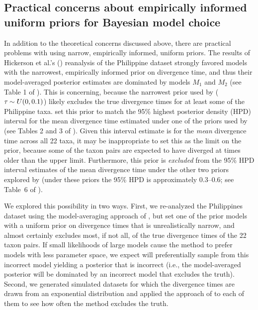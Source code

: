 \subsection{Practical concerns about empirically informed uniform priors for
    Bayesian model choice}
In addition to the theoretical concerns discussed above, there are practical
problems with using narrow, empirically informed, uniform priors.
The results of Hickerson et al.'s (\citeyear{Hickerson2013}) reanalysis of the
Philippine dataset strongly favored models with the narrowest, empirically
informed prior on divergence time, and thus their model-averaged posterior
estimates are dominated by models $M_1$ and $M_2$ (see Table 1 of
\citet{Hickerson2013}).
This is concerning, because the narrowest \divt{} prior used by
\citet{Hickerson2013} ($\tau_{} \sim U(0,0.1)$) likely excludes the true
divergence times for at least some of the Philippine taxa.
\citet{Hickerson2013} set this prior to match the 95\% highest posterior
density (HPD) interval for the mean divergence time estimated under one of the
priors used by \citet{Oaks2012} (see Tables 2 and 3 of \citet{Oaks2012}).
Given this interval estimate is for the \emph{mean} divergence time across all
22 taxa, it may be inappropriate to set this as the limit on the prior, because
some of the taxon pairs are expected to have diverged at times older than the
upper limit.
Furthermore, this prior is \emph{excluded} from the 95\% HPD interval estimates
of the mean divergence time under the other two priors explored by
\citet{Oaks2012} (under these priors the 95\% HPD is approximately 0.3--0.6;
see Table~6 of \citet{Oaks2012}).

We explored this possibility in two ways.
First, we re-analyzed the Philippines dataset using the model-averaging
approach of \citet{Hickerson2013}, but set one of the prior models with a
uniform prior on divergence times that is unrealistically narrow, and almost
certainly excludes most, if not all, of the true divergence times of the 22
taxon pairs.
If small likelihoods of large models cause the method to prefer models with
less parameter space, we expect \msb will preferentially sample from this
incorrect model yielding a posterior that is incorrect (i.e., the
model-averaged posterior will be dominated by an incorrect model that excludes
the truth).
Second, we generated simulated datasets for which the divergence times are
drawn from an exponential distribution and applied the approach of
\citet{Hickerson2013} to each of them to see how often the method excludes the
truth.

